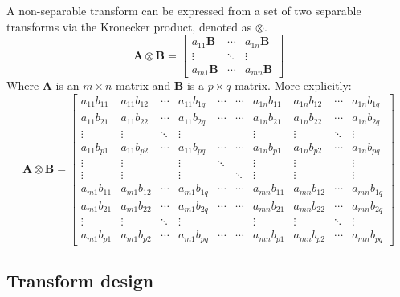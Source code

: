 \documentclass[11pt,a4paper,openright,twoside]{book}
\numberwithin{equation}{section} %
\numberwithin{figure}{section} %
\numberwithin{table}{section} %
\begin{document}
A non-separable transform can be expressed from a set of two separable
transforms via the Kronecker product, denoted as $\otimes$.
\begin{equation}
	\mathbf{A}\otimes\mathbf{B} =
	\begin{bmatrix}
		a_{11} \mathbf{B} & \cdots & a_{1n}\mathbf{B} \\
		\vdots & \ddots & \vdots \\
		a_{m1} \mathbf{B} & \cdots & a_{mn} \mathbf{B}
	\end{bmatrix}
\end{equation}
Where $\mathbf{A}$ is an $m \times n$ matrix and $\mathbf{B}$ is a $p \times
q$ matrix.
More explicitly:
\begin{equation}
	\mathbf{A}\otimes\mathbf{B} =
	\begin{bmatrix}
		a_{11} b_{11} & a_{11} b_{12} & \cdots & a_{11} b_{1q} & \cdots & \cdots & a_{1n} b_{11} & a_{1n} b_{12} & \cdots & a_{1n} b_{1q} \\
		a_{11} b_{21} & a_{11} b_{22} & \cdots & a_{11} b_{2q} & \cdots & \cdots & a_{1n} b_{21} & a_{1n} b_{22} & \cdots & a_{1n} b_{2q} \\
		\vdots & \vdots & \ddots & \vdots & & & \vdots & \vdots & \ddots & \vdots \\
		a_{11} b_{p1} & a_{11} b_{p2} & \cdots & a_{11} b_{pq} & \cdots & \cdots & a_{1n} b_{p1} & a_{1n} b_{p2} & \cdots & a_{1n} b_{pq} \\
		\vdots & \vdots & & \vdots & \ddots & & \vdots & \vdots & & \vdots \\
		\vdots & \vdots & & \vdots & & \ddots & \vdots & \vdots & & \vdots \\
		a_{m1} b_{11} & a_{m1} b_{12} & \cdots & a_{m1} b_{1q} & \cdots & \cdots & a_{mn} b_{11} & a_{mn} b_{12} & \cdots & a_{mn} b_{1q} \\
		a_{m1} b_{21} & a_{m1} b_{22} & \cdots & a_{m1} b_{2q} & \cdots & \cdots & a_{mn} b_{21} & a_{mn} b_{22} & \cdots & a_{mn} b_{2q} \\
		\vdots & \vdots & \ddots & \vdots & & & \vdots & \vdots & \ddots & \vdots \\
		a_{m1} b_{p1} & a_{m1} b_{p2} & \cdots & a_{m1} b_{pq} & \cdots & \cdots & a_{mn} b_{p1} & a_{mn} b_{p2} & \cdots & a_{mn} b_{pq} 
	\end{bmatrix}
\end{equation}

\subsection{Transform design}
\label{sub:transform_design}
\end{document}
